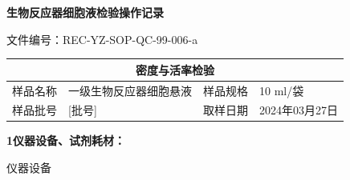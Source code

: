 \documentclass[UTF8,10pt,a4paper,fontset=fandol]{ctexart}
\newcommand{\fieldvalue}[1]{#1}
\newcommand{\handwritten}[1]{#1}
\begin{document}
\newpage

\begin{center}
\textbf{生物反应器细胞液检验操作记录}
\end{center}

\noindent 文件编号：REC-YZ-SOP-QC-99-006-a

\begin{center}
\begin{tabularx}{\textwidth}{|p{2.5cm}|X|p{2.5cm}|X|}
\hline
\multicolumn{4}{|c|}{密度与活率检验}\\
\hline
样品名称 &
\fieldvalue{一级生物反应器细胞悬液} &
样品规格 &
\fieldvalue{\handwritten{10 ml/袋}}\\
\hline
样品批号 &
\fieldvalue{\handwritten{[批号]}} &
取样日期 &
\fieldvalue{\handwritten{2024年03月27日}}\\
\hline
\end{tabularx}
\end{center}

\noindent\textbf{1\quad 仪器设备、试剂耗材：}

\quad 仪器设备
\end{document}
